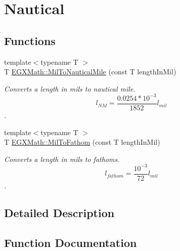 \hypertarget{group___e_g_x_math-_conversions-_length_conversions-_imperial-_mil-_nautical}{}\section{Nautical}
\label{group___e_g_x_math-_conversions-_length_conversions-_imperial-_mil-_nautical}
\subsection*{Functions}
\begin{DoxyCompactItemize}
\item 
{\footnotesize template$<$typename T $>$ }\\T \mbox{\hyperlink{group___e_g_x_math-_conversions-_length_conversions-_imperial-_mil-_nautical_ga1119f841677015f7cd73282f344fa257}{E\+G\+X\+Math\+::\+Mil\+To\+Nautical\+Mile}} (const T length\+In\+Mil)
\begin{DoxyCompactList}\small\item\em Converts a length in mils to nautical mile. \[ l_{NM}= \frac{0.0254 * 10^{-3}}{1852} l_{mil} \]. \end{DoxyCompactList}\item 
{\footnotesize template$<$typename T $>$ }\\T \mbox{\hyperlink{group___e_g_x_math-_conversions-_length_conversions-_imperial-_mil-_nautical_ga33f91cb317832899405279bc3fde4f3a}{E\+G\+X\+Math\+::\+Mil\+To\+Fathom}} (const T length\+In\+Mil)
\begin{DoxyCompactList}\small\item\em Converts a length in mils to fathoms. \[ l_{fathom}= \frac{10^{-3}}{72} l_{mil} \]. \end{DoxyCompactList}\end{DoxyCompactItemize}


\subsection{Detailed Description}


\subsection{Function Documentation}
\mbox{\label{group___e_g_x_math-_conversions-_length_conversions-_imperial-_mil-_nautical_ga33f91cb317832899405279bc3fde4f3a}} 
